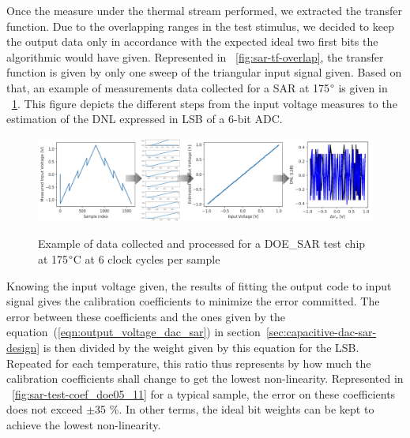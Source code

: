 Once the measure under the thermal stream performed, we extracted the transfer function. Due to the overlapping ranges in the test stimulus, we decided to keep the output data only in accordance with the expected ideal two first bits the algorithmic would have given. Represented in \figurename~\ref{fig:sar-tf-overlap}, the transfer function is given by only one sweep of the triangular input signal given. Based on that, an example of measurements data collected for a SAR at 175$\degree$ is given in \figurename~\ref{fig:sar-vin-to-dnl-proc}. This figure depicts the different steps from the input voltage measures to the estimation of the DNL expressed in LSB of a 6-bit ADC\@.
\begin{figure}[htp]
    \centering
    \includegraphics[width=\textwidth]{Chapter5/Figs/sar_test/graph/sar-process-175deg-osr_6.png}
    \begin{subfigure}[t]{0.25\textwidth}
    \end{subfigure}
    \begin{subfigure}[t]{0.15\textwidth}
    \end{subfigure}
    \begin{subfigure}[t]{0.25\textwidth}
    \end{subfigure}
    \begin{subfigure}[t]{0.25\textwidth}
    \end{subfigure}
    \caption{Example of data collected and processed for a DOE\_SAR test chip at 175$\degree$C at 6 clock cycles per sample}
    \label{fig:sar-vin-to-dnl-proc}
\end{figure}

Knowing the input voltage given, the results of fitting the output code to input signal gives the calibration coefficients to minimize the error committed. The error between these coefficients and the ones given by the equation~(\ref{eqn:output_voltage_dac_sar}) in section~\ref{sec:capacitive-dac-sar-design} is then divided by the weight given by this equation for the LSB\@.
Repeated for each temperature, this ratio thus represents by how much the calibration coefficients shall change to get the lowest non-linearity. Represented in \figurename~\ref{fig:sar-test-coef_doe05_11} for a typical sample, the error on these coefficients does not exceed $\pm$35 \%. In other terms, the ideal bit weights can be kept to achieve the lowest non-linearity.

